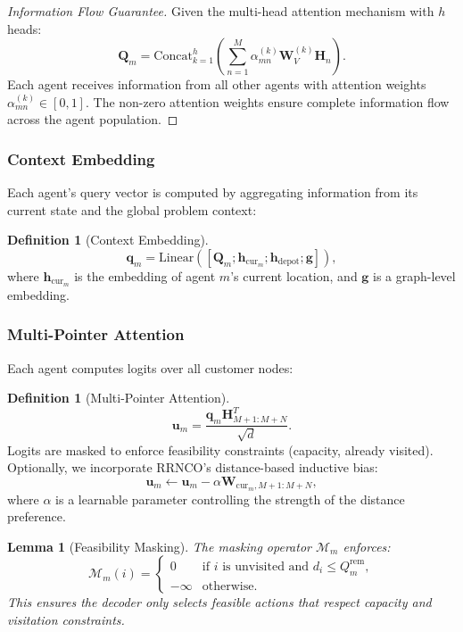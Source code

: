\documentclass[journal,twoside,web]{ieeecolor}
\newtheorem{lemma}[theorem]{Lemma}
\theoremstyle{definition}
\newtheorem{definition}[theorem]{Definition}
\theoremstyle{remark}
\theoremstyle{definition}
\begin{document}
\begin{proof}[Information Flow Guarantee]
Given the multi-head attention mechanism with $h$ heads:
\begin{equation}
\mathbf{Q}_m = \text{Concat}_{k=1}^h \left( \sum_{n=1}^M \alpha^{(k)}_{mn} \mathbf{W}^{(k)}_V \mathbf{H}_n \right).
\end{equation}
Each agent receives information from all other agents with attention weights $\alpha^{(k)}_{mn} \in [0,1]$. The non-zero attention weights ensure complete information flow across the agent population.
\end{proof}

\subsubsection{Context Embedding}
Each agent's query vector is computed by aggregating information from its current state and the global problem context:
\begin{definition}[Context Embedding]
\begin{equation}
\mathbf{q}_m = \text{Linear}([\mathbf{Q}_m; \mathbf{h}_{\text{cur}_m}; \mathbf{h}_{\text{depot}}; \mathbf{g}]),
\end{equation}
where $\mathbf{h}_{\text{cur}_m}$ is the embedding of agent $m$'s current location, and $\mathbf{g}$ is a graph-level embedding.
\end{definition}

\subsubsection{Multi-Pointer Attention}
Each agent computes logits over all customer nodes:
\begin{definition}[Multi-Pointer Attention]
\begin{equation}
\mathbf{u}_m = \frac{\mathbf{q}_m \mathbf{H}_{M+1:M+N}^T}{\sqrt{d}}.
\end{equation}
Logits are masked to enforce feasibility constraints (capacity, already visited). Optionally, we incorporate RRNCO's distance-based inductive bias:
\begin{equation}
\mathbf{u}_m \leftarrow \mathbf{u}_m - \alpha \mathbf{W}_{\text{cur}_m, M+1:M+N},
\end{equation}
where $\alpha$ is a learnable parameter controlling the strength of the distance preference.
\end{definition}

\begin{lemma}[Feasibility Masking]
The masking operator $\mathcal{M}_m$ enforces:
\begin{equation}
\mathcal{M}_m(i) = \begin{cases}
0 & \text{if } i \text{ is unvisited and } d_i \leq Q_m^{\text{rem}}, \\
-\infty & \text{otherwise}.
\end{cases}
\end{equation}
This ensures the decoder only selects feasible actions that respect capacity and visitation constraints.
\end{lemma}
\end{document}
